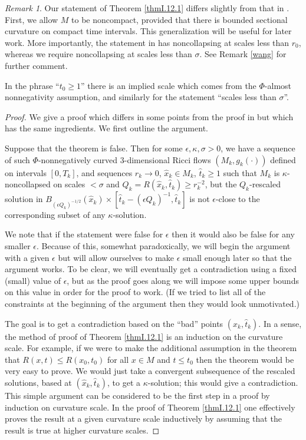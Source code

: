 \documentclass[12pt]{amsart}
\numberwithin{equation}{section}
\theoremstyle{plain}
\theoremstyle{definition}
\theoremstyle{remark}
\newtheorem{remark}[equation]{Remark}
\begin{document}
\begin{remark} \label{wangg}
Our statement of Theorem \ref{thmI.12.1} differs slightly from that
in \cite[Theorem 12.1]{Perelman}. 
First, we allow $M$ to be noncompact, provided that 
there is bounded sectional curvature on compact time intervals.
This generalization will be useful for later work.
More importantly, the statement in \cite[Theorem 12.1]{Perelman}
has noncollapsing at scales less than $r_0$, whereas we require
noncollapsing at scales less than $\sigma$. See Remark \ref{wang} for further
comment.  

In the phrase ``$t_0 \ge 1$'' there is an implied scale which comes
from the $\Phi$-almost nonnegativity assumption, and similarly for the
statement  ``scales less than $\sigma$''.
\end{remark}
\begin{proof}
We give a proof which differs in some points from the proof in 
\cite{Perelman} but which has the same ingredients. We first outline
the argument.

Suppose that the theorem is false.  Then for some $\epsilon, \kappa,\sigma>0$,
we have a sequence of such $\Phi$-nonnegatively curved 
$3$-dimensional Ricci flows $(M_k,g_k(\cdot))$
defined on intervals $[0,T_k]$, 
and sequences $r_k \rightarrow 0$, $\hat{x}_k\in M_k$, $\hat{t}_k\geq 1$ such
that $M_k$ is $\kappa$-noncollapsed on scales $< \sigma$ and
$Q_k = R(\hat{x}_k,\hat{t}_k) \ge r_k^{-2}$, but the $Q_k$-rescaled solution
in $B_{(\epsilon Q_k)^{-1/2}}(\hat{x}_k) \times
[\hat{t}_k - (\epsilon Q_k)^{-1}, \hat{t}_k]$ is not $\epsilon$-close to the
corresponding subset of any $\kappa$-solution.

We note that if the statement were false for $\epsilon$ then it would
also be false for any smaller $\epsilon$. Because of
this, somewhat paradoxically, we will begin the argument with a
given $\epsilon$ but will allow ourselves to make $\epsilon$ small
enough later so that the argument works. 
To be clear, we will eventually get a contradiction using a fixed
(small) value of $\epsilon$, but as the proof goes along we will
impose some upper bounds on this value in order for the proof to work. 
(If we tried to list all of
the constraints at the beginning of the argument then they would
look unmotivated.)

The goal is to get a contradiction based on the ``bad'' points
$(\widehat{x}_k, \widehat{t}_k)$.
In a sense, the method of proof of Theorem \ref{thmI.12.1} is an induction on
the curvature scale. For example, if we were to make the additional
assumption in the theorem 
 that $R(x, t) \le R(x_0, t_0)$ for all $x \in M$ and $t \le t_0$
then the theorem would be very easy to prove. We would just take
a convergent subsequence of the rescaled solutions, based at 
$(\hat{x}_k, \hat{t}_k)$, to get a $\kappa$-solution; this would
give a contradiction. This simple argument
can be considered to be the first step
in a proof by induction on curvature scale. In the proof of
Theorem \ref{thmI.12.1} one effectively proves the result at a
given curvature scale inductively by assuming that the result
is true at higher curvature scales.


\end{proof}
\end{document}
